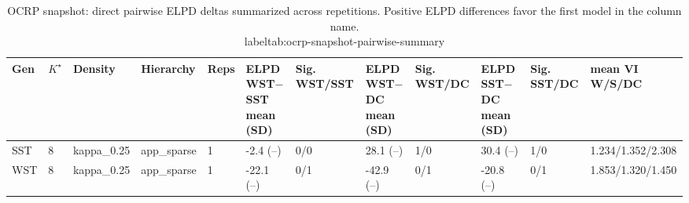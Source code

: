\begin{table}[!h]
\centering
\caption{OCRP snapshot: direct pairwise ELPD deltas summarized across repetitions. Positive ELPD differences favor the first model in the column name.\\label{tab:ocrp-snapshot-pairwise-summary}}
\centering
\begin{tabular}[t]{llllllllllll}
\toprule
Gen & $K^\star$ & Density & Hierarchy & Reps & ELPD WST$-$SST mean (SD) & Sig. WST/SST & ELPD WST$-$DC mean (SD) & Sig. WST/DC & ELPD SST$-$DC mean (SD) & Sig. SST/DC & mean VI W/S/DC\\
\midrule
SST & 8 & kappa_0.25 & app_sparse & 1 & -2.4 (--) & 0/0 & 28.1 (--) & 1/0 & 30.4 (--) & 1/0 & 1.234/1.352/2.308\\
WST & 8 & kappa_0.25 & app_sparse & 1 & -22.1 (--) & 0/1 & -42.9 (--) & 0/1 & -20.8 (--) & 0/1 & 1.853/1.320/1.450\\
\bottomrule
\end{tabular}
\end{table}
